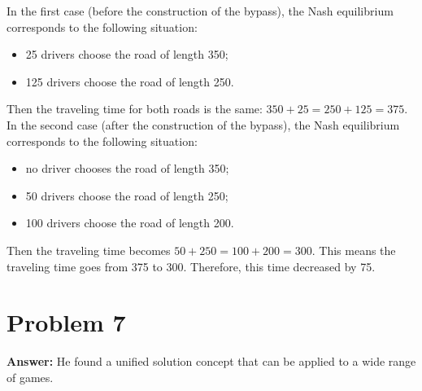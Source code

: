 \documentclass[11pt]{article}
\begin{document}
In the first case (before the construction of the bypass), the Nash equilibrium
corresponds to the following situation:
\begin{itemize}
\item 25 drivers choose the road of length 350;
\item 125 drivers choose the road of length 250.
\end{itemize}
Then the traveling time for both roads is the same: \(350+25=250+125=375\).\\
In the second case (after the construction of the bypass), the Nash equilibrium
corresponds to the following situation:
\begin{itemize}
\item no driver chooses the road of length 350;
\item 50 drivers choose the road of length 250;
\item 100 drivers choose the road of length 200.
\end{itemize}
Then the traveling time becomes \(50+250=100+200=300\). This means the
traveling time goes from 375 to 300. Therefore, this time decreased by 75.
\section*{Problem 7}
\label{sec:orgda80aa9}

\textbf{Answer:} He found a unified solution concept that can be applied to a wide
range of games.
\end{document}
